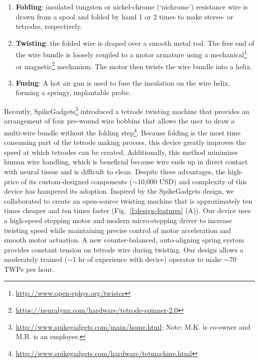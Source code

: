 \documentclass[11pt,a4paper]{article}
\begin{document}
\begin{enumerate}
    \item \textbf{Folding}: insulated tungsten or nickel-chrome (`nichrome')
        resistance wire is drawn from a spool and folded by hand 1 or 2 times
        to make stereo- or tetrodes, respectively.
    \item \textbf{Twisting}: the folded wire is draped over a smooth metal rod.
        The free end of the wire bundle is loosely coupled to a motor armature
        using a mechanical\footnote{\url{http://www.open-ephys.org/twister}} or
        magnetic\footnote{\url{https://neuralynx.com/hardware/tetrode-spinner-2.0}}
        mechanism. The motor then twists the wire bundle into a helix.
    \item \textbf{Fusing}: A hot air gun is used to fuse the insulation
        on the wire helix, forming a springy, implantable probe.
\end{enumerate}

Recently,
SpikeGadgets\footnote{\url{http://www.spikegadgets.com/main/home.html}; Note:
M.K. is co-owner and M.B. is an employee.} introduced a tetrode twisting
machine that provides an arrangement of four pre-wound wire bobbins that allows
the user to draw a multi-wire bundle without the folding
step\footnote{\url{http://www.spikegadgets.com/hardware/tetmachine.html}}.
Because folding is the most time consuming part of the tetrode making process,
this device greatly improves the speed at which tetrodes can be created.
Additionally, this method minimizes human wire handling, which is beneficial
because wire ends up in direct contact with neural tissue and is difficult to
clean. Despite these advantages, the high-price of its custom-designed
components ($\sim$10,000 USD) and complexity of this device has hampered its
adoption. Inspired by the SpikeGadgets design, we collaborated to create an
open-source twisting machine that is approximately ten times cheaper and ten times faster
(Fig.~\ref{f:design-features} (A)). Our device uses a high-speed stepping motor
and modern micro-stepping driver to increase twisting speed while maintaining
precise control of motor acceleration and smooth motor actuation. A new
counter-balanced, auto-aligning spring system provides constant tension on
tetrode wire during twisting. Our design allows a moderately trained ($\sim$1
hr of experience with device) operator to make $\sim$70 TWPs per hour.
\end{document}
